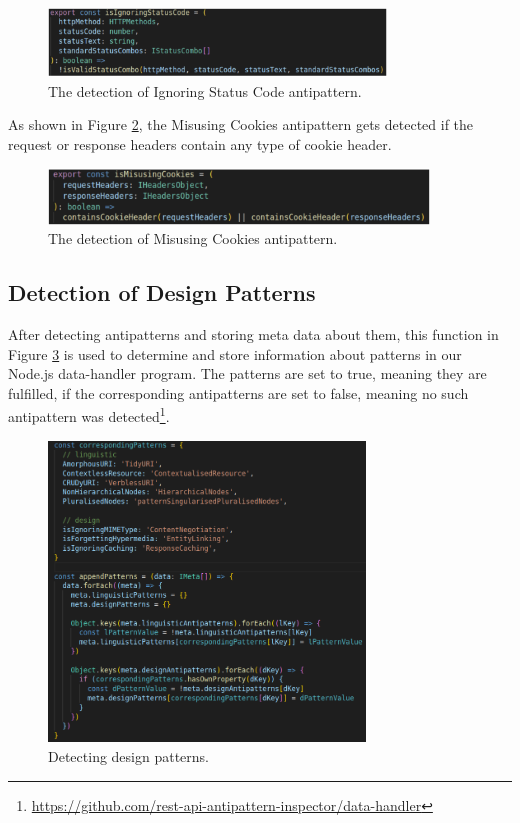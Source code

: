 \begin{figure}[h!]
 \centering
 \includegraphics[width=0.8\textwidth]{img/ignoringStatusCode.png}
 \caption{The detection of Ignoring Status Code antipattern.}
 \label{fig:IgnoringStatusCode}
\end{figure}

As shown in Figure \ref{fig:MisusingCookies}, the Misusing Cookies antipattern gets detected if the request or response headers contain any type of cookie header.

\begin{figure}[h!]
 \centering
 \includegraphics[width=0.9\textwidth]{img/misusingCookies.png}
    \caption{The detection of Misusing Cookies antipattern.}
    \label{fig:MisusingCookies}
\end{figure}

\subsection{Detection of Design Patterns}

After detecting antipatterns and storing meta data about them, this function in Figure \ref{fig:Detectingpatterns} is used to determine and store information about patterns in our Node.js data-handler program. The patterns are set to true, meaning they are fulfilled, if the corresponding antipatterns are set to false, meaning no such antipattern was detected\footnote{\url{https://github.com/rest-api-antipattern-inspector/data-handler}}.

\begin{figure}[h!]
\begin{center}
\includegraphics[width=0.75\textwidth]{img/patternsFunction.png}
    \caption{Detecting design patterns.}
    \label{fig:Detectingpatterns}
    \end{center}
\end{figure}

